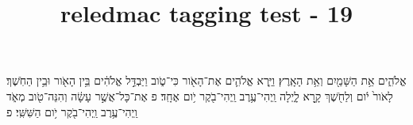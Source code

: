 \documentclass{article}
\title{reledmac tagging test - 19}
\begin{document}

\beginnumbering


\pstart
{}
אֱלֹהִ֑ים אֵ֥ת הַשָּׁמַ֖יִם וְאֵ֥ת הָאָֽרֶץ׃
וַיַּ֧רְא אֱלֹהִ֛ים אֶת־הָאֹ֖ור כִּי־טֹ֑וב וַיַּבְדֵּ֣ל אֱלֹהִ֔ים בֵּ֥ין הָאֹ֖ור וּבֵ֥ין הַחֹֽשֶׁךְ׃
 לָאֹור֙ יֹ֔ום וְלַחֹ֖שֶׁךְ קָ֣רָא לָ֑יְלָה וַֽיְהִי־עֶ֥רֶב וַֽיְהִי־בֹ֖קֶר יֹ֥ום אֶחָֽד׃ פ
 אֶת־כָּל־אֲשֶׁ֣ר עָשָׂ֔ה וְהִנֵּה־טֹ֖וב מְאֹ֑ד וַֽיְהִי־עֶ֥רֶב וַֽיְהִי־בֹ֖קֶר יֹ֥ום הַשִּׁשִּֽׁי׃ פ

\pend
\endnumbering
\end{document}
